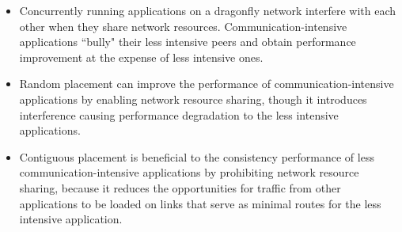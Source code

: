 


\begin{itemize}
   
    \item Concurrently running applications on a dragonfly network interfere with each other when they share network resources. Communication-intensive applications ``bully" their less intensive peers and obtain performance improvement at the expense of less intensive ones. 
    
    \item Random placement can improve the performance of communication-intensive applications by enabling network resource sharing, though it introduces interference causing performance degradation to the less intensive applications.
    
   \item Contiguous placement is beneficial to the consistency performance of less communication-intensive applications by prohibiting network resource sharing, because it reduces the opportunities for traffic from other applications to be loaded on links that serve as minimal routes for the less intensive application.
    
    
\end{itemize}

